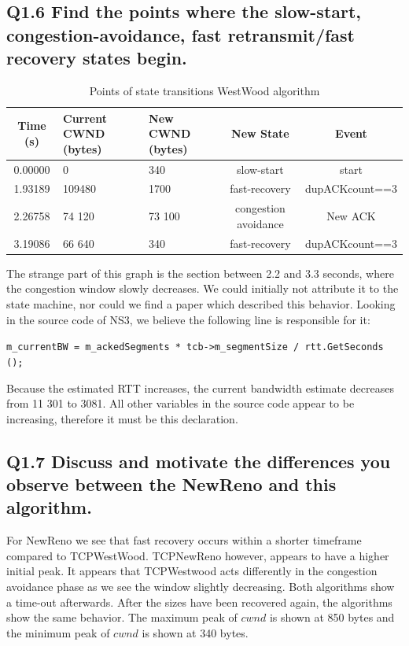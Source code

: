 \documentclass{article}
\begin{document}
\subsection{Q1.6 Find the points where the slow-start, congestion-avoidance, fast retransmit/fast recovery states begin.}

\begin{table}[H]
\center
\caption{Points of state transitions WestWood algorithm}
\label{table:results2}
\begin{tabular}{|c|p{25mm}|p{20mm}|c|c|}
\hline Time (s)    & Current CWND (bytes)    & New CWND (bytes)    & New State             & Event            \\
\hline 0.00000     & 0                       & 340                 & slow-start            & start            \\ 
\hline 1.93189     & 109480                  & 1700                & fast-recovery         & dupACKcount==3   \\ 
\hline 2.26758     & 74 120                  & 73 100              & congestion avoidance  & New ACK  \\ 
\hline 3.19086     & 66 640                  & 340                 & fast-recovery         & dupACKcount==3 \\ 
\hline  
\end{tabular} 
\end{table}



The strange part of this graph is the section between 2.2 and 3.3 seconds,
where the congestion window slowly decreases. We could initially not attribute
it to the state machine, nor could we find a paper which described this
behavior. Looking in the source code of NS3, we believe the following line
is responsible for it:

\texttt{m\_currentBW = m\_ackedSegments * tcb->m\_segmentSize / rtt.GetSeconds ();}

Because the estimated RTT increases, the current bandwidth estimate decreases
from 11 301 to 3081. All other variables in the source code appear to be
increasing, therefore it must be this declaration.


\subsection{Q1.7 Discuss and motivate the differences you observe between the NewReno and this algorithm.}
For NewReno we see that fast recovery occurs within a shorter timeframe compared to TCPWestWood. TCPNewReno however, appears to have a higher initial peak. It appears that TCPWestwood acts differently in the congestion avoidance phase as we see the window slightly decreasing. Both algorithms show a time-out afterwards. After the sizes have been recovered again, the algorithms show the same behavior. The maximum peak of $cwnd$ is shown at 850 bytes and the minimum peak of $cwnd$ is shown at 340 bytes.
\end{document}
